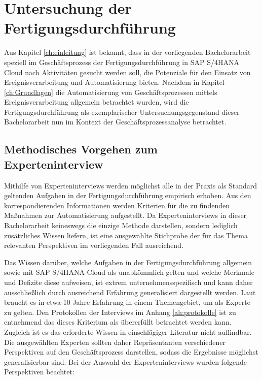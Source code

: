\section{Untersuchung der Fertigungsdurchführung}\label{sec:untersuchung}

Aus Kapitel \ref{ch:einleitung} ist bekannt, dass in der vorliegenden Bachelorarbeit speziell im Geschäftsprozess der Fertigungsdurchführung in SAP S/4HANA Cloud nach Aktivitäten gesucht werden soll, die Potenziale für den Einsatz von Ereignisverarbeitung und Automatisierung bieten. 
Nachdem in Kapitel \ref{ch:Grundlagen} die Automatisierung von Geschäftsprozessen mittels Ereignisverarbeitung allgemein betrachtet wurden, wird die Fertigungsdurchführung als exemplarischer Untersuchungsgegenstand dieser Bachelorarbeit nun im Kontext der Geschäftsprozessanalyse betrachtet. 

\subsection{Methodisches Vorgehen zum Experteninterview}
Mithilfe von Experteninterviews werden möglichst alle in der Praxis als Standard geltenden Aufgaben in der Fertigungsdurchführung empirisch erhoben.
\cite{Kaiser.2014}
Aus den korrespondierenden Informationen werden Kriterien für die zu findenden Maßnahmen zur Automatisierung aufgestellt. 
Da Experteninterviews in dieser Bachelorarbeit keineswegs die einzige Methode darstellen, sondern lediglich zusätzliches Wissen liefern, ist eine ausgewählte Stichprobe der für das Thema relevanten Perspektiven im vorliegenden Fall ausreichend.

Das Wissen darüber, welche Aufgaben in der Fertigungsdurchführung allgemein sowie mit SAP S/4HANA Cloud als unabkömmlich gelten und welche Merkmale und Defizite diese aufweisen, ist extrem unternehmensspezifisch und kann daher ausschließlich durch ausreichend Erfahrung generalisiert dargestellt werden. 
Laut \citeauthor{Mieg.2005} braucht es in etwa 10 Jahre Erfahrung in einem Themengebiet, um als Experte zu gelten.
\cite{Mieg.2005} Den Protokollen der Interviews im Anhang \ref{ah:protokolle} ist zu entnehmend das dieses Kriterium als übererfüllt betrachtet werden kann.
Zugleich ist es das erforderte Wissen in einschlägiger Literatur nicht auffindbar.
Die ausgewählten Experten sollten daher Repräsentanten verschiedener Perspektiven auf den Geschäftsprozess darstellen, sodass die Ergebnisse möglichst generalisierbar sind. 
Bei der Auswahl der Experteninterviews wurden folgende Perspektiven beachtet:

